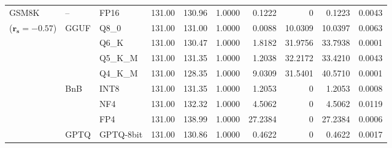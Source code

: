 \begin{longtable}{ll l rrrrrrr}
\midrule
GSM8K & -- & FP16 & 131.00 & 130.96 & 1.0000 & 0.1222 & \cellcolor{cyan!12} $0$ & 0.1223 & 0.0043 \\
{\small ($\mathbf{r_s{=}-0.57}$)} & GGUF & Q8\_0 & 131.00 & 131.00 & 1.0000 & 0.0088 & 10.0309 & 10.0397 & 0.0063 \\
 &  & Q6\_K & 131.00 & 130.47 & 1.0000 & 1.8182 & 31.9756 & 33.7938 & 0.0001 \\
 &  & Q5\_K\_M & 131.00 & 131.35 & 1.0000 & 1.2038 & 32.2172 & 33.4210 & 0.0043 \\
 &  & Q4\_K\_M & 131.00 & 128.35 & 1.0000 & 9.0309 & 31.5401 & 40.5710 & 0.0001 \\
 & BnB & INT8 & 131.00 & 131.35 & 1.0000 & 1.2053 & \cellcolor{cyan!12} $0$ & 1.2053 & 0.0008 \\
 &  & NF4 & 131.00 & 132.32 & 1.0000 & 4.5062 & \cellcolor{cyan!12} $0$ & 4.5062 & 0.0119 \\
 &  & FP4 & 131.00 & 138.99 & 1.0000 & 27.2384 & \cellcolor{cyan!12} $0$ & 27.2384 & 0.0006 \\
 & GPTQ & GPTQ-8bit & 131.00 & 130.86 & 1.0000 & 0.4622 & \cellcolor{cyan!12} $0$ & 0.4622 & 0.0017 \\
\end{longtable}
\endgroup